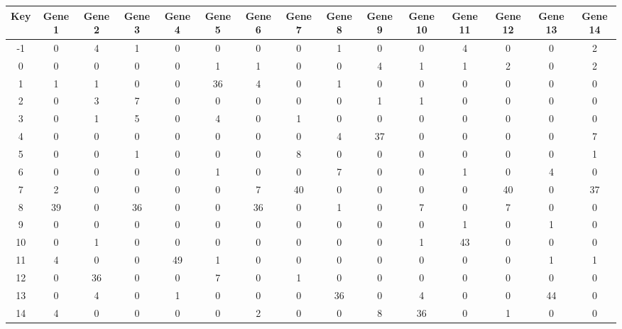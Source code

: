 \begin{tabular}{|c|c|c|c|c|c|c|c|c|c|c|c|c|c|c|}
\hline
Key & Gene 1 & Gene 2 & Gene 3 & Gene 4 & Gene 5 & Gene 6 & Gene 7 & Gene 8 & Gene 9 & Gene 10 & Gene 11 & Gene 12 & Gene 13 & Gene 14 \\
\hline
-1 & 0 & 4 & 1 & 0 & 0 & 0 & 0 & 1 & 0 & 0 & 4 & 0 & 0 & 2 \\
0 & 0 & 0 & 0 & 0 & 1 & 1 & 0 & 0 & 4 & 1 & 1 & 2 & 0 & 2 \\
1 & 1 & 1 & 0 & 0 & 36 & 4 & 0 & 1 & 0 & 0 & 0 & 0 & 0 & 0 \\
2 & 0 & 3 & 7 & 0 & 0 & 0 & 0 & 0 & 1 & 1 & 0 & 0 & 0 & 0 \\
3 & 0 & 1 & 5 & 0 & 4 & 0 & 1 & 0 & 0 & 0 & 0 & 0 & 0 & 0 \\
4 & 0 & 0 & 0 & 0 & 0 & 0 & 0 & 4 & 37 & 0 & 0 & 0 & 0 & 7 \\
5 & 0 & 0 & 1 & 0 & 0 & 0 & 8 & 0 & 0 & 0 & 0 & 0 & 0 & 1 \\
6 & 0 & 0 & 0 & 0 & 1 & 0 & 0 & 7 & 0 & 0 & 1 & 0 & 4 & 0 \\
7 & 2 & 0 & 0 & 0 & 0 & 7 & 40 & 0 & 0 & 0 & 0 & 40 & 0 & 37 \\
8 & 39 & 0 & 36 & 0 & 0 & 36 & 0 & 1 & 0 & 7 & 0 & 7 & 0 & 0 \\
9 & 0 & 0 & 0 & 0 & 0 & 0 & 0 & 0 & 0 & 0 & 1 & 0 & 1 & 0 \\
10 & 0 & 1 & 0 & 0 & 0 & 0 & 0 & 0 & 0 & 1 & 43 & 0 & 0 & 0 \\
11 & 4 & 0 & 0 & 49 & 1 & 0 & 0 & 0 & 0 & 0 & 0 & 0 & 1 & 1 \\
12 & 0 & 36 & 0 & 0 & 7 & 0 & 1 & 0 & 0 & 0 & 0 & 0 & 0 & 0 \\
13 & 0 & 4 & 0 & 1 & 0 & 0 & 0 & 36 & 0 & 4 & 0 & 0 & 44 & 0 \\
14 & 4 & 0 & 0 & 0 & 0 & 2 & 0 & 0 & 8 & 36 & 0 & 1 & 0 & 0 \\
\hline
\end{tabular}